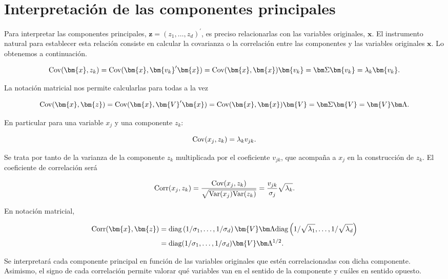 \documentclass[
  a4paper,
  oneside]{scrbook}
\theoremstyle{definition}
\theoremstyle{definition}
\theoremstyle{definition}
\theoremstyle{definition}
\theoremstyle{remark}
\begin{document}
\section{Interpretación de las componentes principales}\label{interpretacion-de-las-componentes-principales}

Para interpretar las componentes principales,
\(\bm{z}=(z_1,\ldots,z_d)^\prime{}\), es preciso relacionarlas con las
variables originales, \(\bm{x}\). El instrumento natural para establecer
esta relación consiste en calcular la covarianza o la correlación entre
las componentes y las variables originales \(\bm{x}\). Lo obtenemos a
continuación.

\[\textnormal{Cov}(\bm{x},z_k)=\textnormal{Cov}(\bm{x}, \bm{v_k}^{\prime}\bm{x})=\textnormal{Cov}(\bm{x},\bm{x})\bm{v_k}=\bm\Sigma \bm{v_k}=\lambda_k \bm{v_k}.\]

La notación matricial nos permite calcularlas para todas a la vez

\[\textnormal{Cov}(\bm{x},\bm{z})=\textnormal{Cov}(\bm{x}, \bm{V}^{\prime}\bm{x})=\textnormal{Cov}(\bm{x},\bm{x})\bm{V}=\bm\Sigma \bm{V}=\bm{V}\bm\Lambda.\]

En particular para una variable \(x_j\) y una componente \(z_k\):

\[\textnormal{Cov}(x_j,z_k)=\lambda_k v_{jk}.\]

Se trata por tanto de la varianza de la componente \(z_k\) multiplicada
por el coeficiente \(v_{jk}\), que acompaña a \(x_j\) en la construcción de
\(z_k\). El coeficiente de correlación será

\[\textnormal{Corr}(x_j,z_k)=\frac{\textnormal{Cov}(x_j,z_k)}{\sqrt{\textnormal{Var}(x_j) \textnormal{Var}(z_k)}}
=\frac{v_{jk}}{\sigma_j}\sqrt{\lambda_k}.\]

En notación matricial,

\[\begin{aligned}
\textnormal{Corr}(\bm{x},\bm{z})&=\mbox{diag}\left(1/\sigma_1,\ldots,1/\sigma_d\right) \bm{V} \bm\Lambda
\mbox{diag}\left(1/\sqrt{\lambda_1},\ldots, 1/\sqrt{\lambda_d}\right)\\
&=
\mbox{diag}(1/\sigma_1,\ldots,1/\sigma_d) \bm{V} \bm\Lambda^{1/2}.
\end{aligned}\]

Se interpretará cada componente principal en función de las variables
originales que estén correlacionadas con dicha componente. Asimismo, el
signo de cada correlación permite valorar qué variables van en el
sentido de la componente y cuáles en sentido opuesto.
\end{document}
